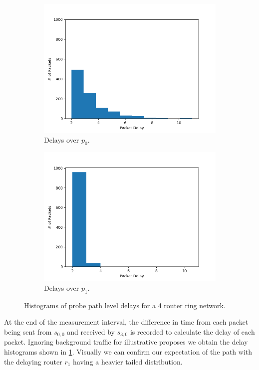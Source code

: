 \begin{figure}[t]
    \begin{subfigure}[b]{0.475\textwidth}
        \includegraphics[width=\textwidth]{figs/intro/p0_delayhist.png}
        \caption[]{Delays over $p_0$.}
    \end{subfigure}
    \begin{subfigure}[b]{0.475\textwidth}
        \includegraphics[width=\textwidth]{figs/intro/p1_delayhist.png}
        \caption[]{Delays over $p_1$.}
    \end{subfigure}
    \caption{Histograms of probe path level delays for a 4 router ring network.}
    \label{fig:ppdelayhist}
\end{figure}
At the end of the measurement interval, the difference in time from each packet being sent from $s_{0,0}$ and received by $s_{3,0}$ is recorded to calculate the delay of each packet. Ignoring background traffic for illustrative proposes we obtain the delay histograms shown in \cref{fig:ppdelayhist}. Visually we can confirm our expectation of the path with the delaying router $r_1$ having a heavier tailed distribution.\par
